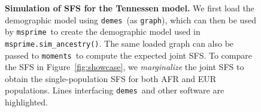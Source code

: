 \documentclass[11pt]{article}
\newcommand{\msprime}[0]{\texttt{msprime}}
\newcommand{\demes}[0]{\texttt{demes}}
\newcommand{\moments}[0]{\texttt{moments}}
\begin{document}
\begin{figure}[h!]
    \begin{tcolorbox}
        \inputminted[fontsize=\scriptsize,linenos,numbersep=5pt,highlightlines={9,19,52}]{python}{models/tennessen-simulation.py}
    \end{tcolorbox}
    \caption{
        \textbf{Simulation of SFS for the Tennessen model.}
        We first load the demographic model using \demes\ (as \texttt{graph}),
        which can then be used by \msprime\ to create the demographic model used in
        \texttt{msprime.sim\_ancestry()}. The same loaded graph can also be
        passed to \moments\ to compute the expected joint SFS.
        To compare the SFS in Figure~\ref{fig:showcase}, we \emph{marginalize} the
        joint SFS to obtain the single-population SFS for both AFR and EUR populations.
        Lines interfacing \demes\ and other software are highlighted.
    }
    \label{fig:tennessen-simulation}
\end{figure}
\end{document}
